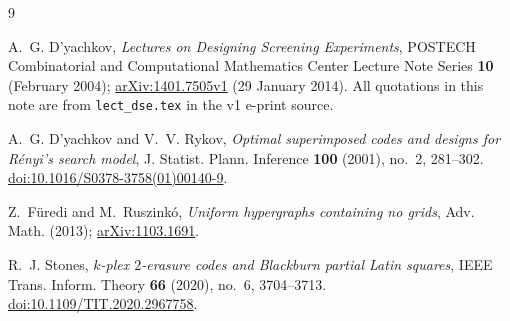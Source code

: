 \documentclass[11pt]{amsart}
\theoremstyle{definition}
\theoremstyle{remark}
\begin{document}
\begin{thebibliography}{9}

A.~G. D'yachkov,
\emph{Lectures on Designing Screening Experiments},
POSTECH Combinatorial and Computational Mathematics Center Lecture Note
Series \textbf{10} (February 2004);
\href{https://arxiv.org/abs/1401.7505v1}{arXiv:1401.7505v1} (29 January 2014).
All quotations in this note are from \texttt{lect\_dse.tex} in the v1 e-print
source.

A.~G. D'yachkov and V.~V. Rykov,
\emph{Optimal superimposed codes and designs for R\'enyi's search model},
J. Statist. Plann. Inference \textbf{100} (2001), no.~2, 281--302.
\href{https://doi.org/10.1016/S0378-3758(01)00140-9}{doi:10.1016/S0378-3758(01)00140-9}.

Z.~F\"uredi and M.~Ruszink\'o,
\emph{Uniform hypergraphs containing no grids},
Adv. Math. (2013);
\href{https://arxiv.org/abs/1103.1691}{arXiv:1103.1691}.

R.~J. Stones,
\emph{$k$-plex $2$-erasure codes and Blackburn partial Latin squares},
IEEE Trans. Inform. Theory \textbf{66} (2020), no.~6, 3704--3713.
\href{https://doi.org/10.1109/TIT.2020.2967758}{doi:10.1109/TIT.2020.2967758}.

\end{thebibliography}
\end{document}

